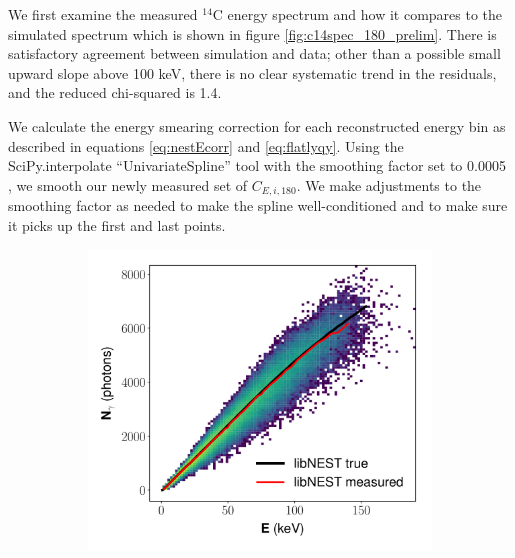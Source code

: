 We first examine the measured $^{14}$C energy spectrum and how it compares to the simulated spectrum which is shown in figure \ref{fig:c14spec_180_prelim}. There is satisfactory agreement between simulation and data; other than a possible small upward slope above 100 keV, there is no clear systematic trend in the residuals, and the reduced chi-squared is 1.4.

We calculate the energy smearing correction for each reconstructed energy bin as described in equations \ref{eq:nestEcorr} and \ref{eq:flatlyqy}. Using the SciPy.interpolate ``UnivariateSpline'' tool with the smoothing factor set to 0.0005 \cite{scipy}, we smooth our newly measured set of $C_{E,i,180}$. We make adjustments to the smoothing factor as needed to make the spline well-conditioned and to make sure it picks up the first and last points.
\begin{figure}[h!]
\centering
\begin{subfigure}{0.5\textwidth}
  \centering
  \includegraphics[width=\textwidth]{Figures/yields_corrections/C14_LN_heatmap_gfdcm_180Vcm_prelim.pdf}
  \caption{}
\end{subfigure}%
\begin{subfigure}{0.5\textwidth}
  \centering

\end{subfigure}
\end{figure}
